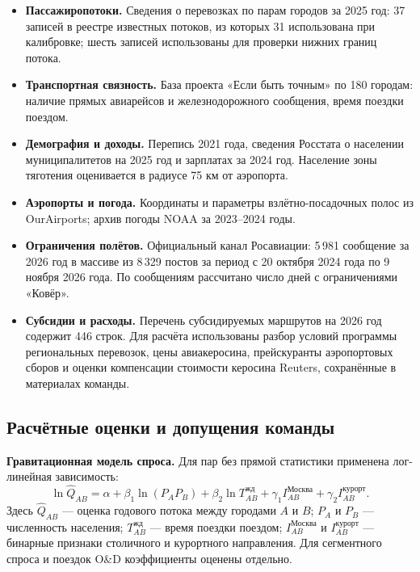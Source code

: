 \documentclass[11pt,a4paper]{article}
\begin{document}
\begin{itemize}
    \item \textbf{Пассажиропотоки.} Сведения о перевозках по парам городов
    за 2025 год: 37 записей в реестре известных потоков, из которых 31
    использована при калибровке; шесть записей использованы для проверки
    нижних границ потока.
    \item \textbf{Транспортная связность.} База проекта «Если быть точным»
    по 180 городам: наличие прямых авиарейсов и железнодорожного сообщения,
    время поездки поездом.
    \item \textbf{Демография и доходы.} Перепись 2021 года, сведения
    Росстата о населении муниципалитетов на 2025 год и зарплатах за 2024 год.
    Население зоны тяготения оценивается в радиусе 75 км от аэропорта.
    \item \textbf{Аэропорты и погода.} Координаты и параметры
    взлётно-посадочных полос из OurAirports; архив погоды NOAA за 2023--2024 годы.
    \item \textbf{Ограничения полётов.} Официальный канал Росавиации:
    5\,981 сообщение за 2026 год в массиве из 8\,329 постов
    за период с 20 октября 2024 года по 9 ноября 2026 года.
    По сообщениям рассчитано число дней с ограничениями «Ковёр».
    \item \textbf{Субсидии и расходы.} Перечень субсидируемых маршрутов
    на 2026 год содержит 446 строк. Для расчёта использованы разбор условий
    программы региональных перевозок, цены авиакеросина, прейскуранты
    аэропортовых сборов и оценки компенсации стоимости керосина Reuters,
    сохранённые в материалах команды.
\end{itemize}

\subsection*{Расчётные оценки и допущения команды}

\textbf{Гравитационная модель спроса.}
Для пар без прямой статистики применена лог-линейная зависимость:
\[
    \ln \widehat Q_{AB}
    =\alpha
    +\beta_1\ln(P_A P_B)
    +\beta_2\ln T_{AB}^{\text{жд}}
    +\gamma_1 I_{AB}^{\text{Москва}}
    +\gamma_2 I_{AB}^{\text{курорт}}.
\]
Здесь $\widehat Q_{AB}$ --- оценка годового потока между городами $A$ и $B$;
$P_A$ и $P_B$ --- численность населения;
$T_{AB}^{\text{жд}}$ --- время поездки поездом;
$I_{AB}^{\text{Москва}}$ и $I_{AB}^{\text{курорт}}$ --- бинарные признаки
столичного и курортного направления. Для сегментного спроса и поездок
O\&D коэффициенты оценены отдельно.
\end{document}
